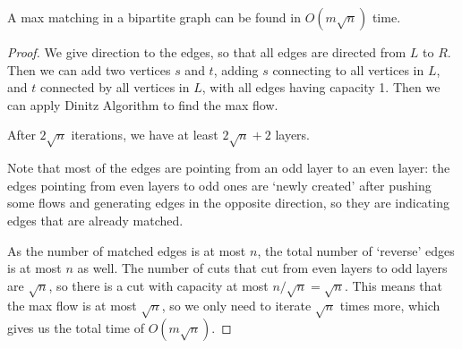 \begin{theorem}
	A max matching in a bipartite graph can be found in $O(m\sqrt{n})$ time.
\end{theorem}
\begin{proof}
	We give direction to the edges, so that all edges are directed from $L$ to $R$. Then we can add two vertices $s$ and $t$,	adding $s$ connecting to all vertices in $L$, and $t$ connected by all vertices in $L$, with all edges having capacity 1. Then we can apply Dinitz Algorithm to find the max flow.

	After $2\sqrt{n}$ iterations, we have at least $2\sqrt{n}+2$ layers.

	Note that most of the edges are pointing from an odd layer to an even layer: the edges pointing from even layers to odd ones are `newly created' after pushing some flows and generating edges in the opposite direction, so they are indicating edges that are already matched.

	As the number of matched edges is at most $n$, the total number of `reverse' edges is at most $n$ as well. The number of cuts that cut from even layers to odd layers are $\sqrt{n}$, so there is a cut with capacity at most $n/\sqrt{n} = \sqrt{n}$. This means that the max flow is at most $\sqrt{n}$, so we only need to iterate $\sqrt{n}$ times more, which gives us the total time of $O(m\sqrt{n})$.
\end{proof}
